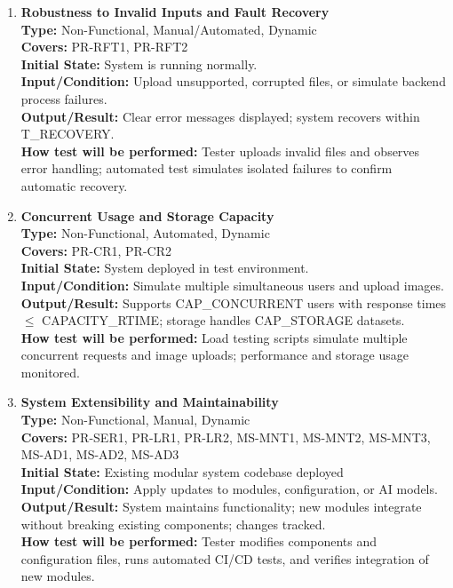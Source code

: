 \documentclass[12pt, titlepage]{article}
\begin{document}
\begin{enumerate}[label=NFR-ST \arabic*., wide=0pt, leftmargin=*]
  \item \textbf{Robustness to Invalid Inputs and Fault Recovery} \\[2mm]
    \textbf{Type:} Non-Functional, Manual/Automated, Dynamic \\
    \textbf{Covers:} PR-RFT1, PR-RFT2 \\
    \textbf{Initial State:} System is running normally. \\
    \textbf{Input/Condition:} Upload unsupported, corrupted files, or
    simulate backend process failures. \\
    \textbf{Output/Result:} Clear error messages displayed; system
    recovers within T\_RECOVERY. \\[2mm]
    \textbf{How test will be performed:} Tester uploads invalid files
    and observes error handling; automated test simulates isolated
    failures to confirm automatic recovery.

  \item \textbf{Concurrent Usage and Storage Capacity} \\[2mm]
    \textbf{Type:} Non-Functional, Automated, Dynamic \\
    \textbf{Covers:} PR-CR1, PR-CR2 \\
    \textbf{Initial State:} System deployed in test environment. \\
    \textbf{Input/Condition:} Simulate multiple simultaneous users
    and upload images. \\
    \textbf{Output/Result:} Supports CAP\_CONCURRENT users with
    response times $\le$ CAPACITY\_RTIME; storage handles CAP\_STORAGE datasets. \\[2mm]
    \textbf{How test will be performed:} Load testing scripts
    simulate multiple concurrent requests and image uploads;
    performance and storage usage monitored.

  \item \textbf{System Extensibility and Maintainability} \\[2mm]
    \textbf{Type:} Non-Functional, Manual, Dynamic \\
    \textbf{Covers:} PR-SER1, PR-LR1, PR-LR2, MS-MNT1, MS-MNT2,
    MS-MNT3, MS-AD1, MS-AD2, MS-AD3 \\
    \textbf{Initial State:} Existing modular system codebase deployed \\
    \textbf{Input/Condition:} Apply updates to modules,
    configuration, or AI models. \\
    \textbf{Output/Result:} System maintains functionality; new
    modules integrate without breaking existing components; changes
    tracked. \\[2mm]
    \textbf{How test will be performed:} Tester modifies components
    and configuration files, runs automated CI/CD tests, and verifies
    integration of new modules.


\end{enumerate}
\end{document}

